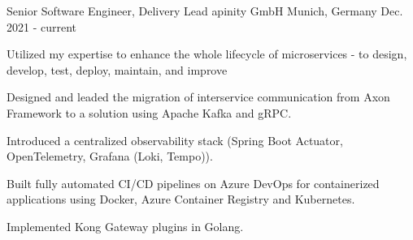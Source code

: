 

\begin{cventries}

    \cventry
    {Senior Software Engineer, Delivery Lead} %
    {apinity GmbH} %
    {Munich, Germany} %
    {Dec. 2021 - current} %
    {
        \begin{cvitems} %
            \item {Utilized my expertise to enhance the whole lifecycle of microservices - to design, develop, test, deploy, maintain, and improve}
            \item {Designed and leaded the migration of interservice communication from Axon Framework to a solution using Apache Kafka and gRPC.}
            \item {Introduced a centralized observability stack (Spring Boot Actuator, OpenTelemetry, Grafana (Loki, Tempo)).}
            \item {Built fully automated CI/CD pipelines on Azure DevOps for containerized applications using Docker, Azure Container Registry and Kubernetes.}
            \item {Implemented Kong Gateway plugins in Golang.}
        \end{cvitems}
    }


\end{cventries}
